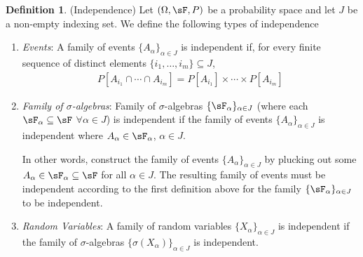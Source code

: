 \documentclass[12pt]{article}
\theoremstyle{plain}
\theoremstyle{definition}
\newtheorem{defn}[thm]{Definition}
\theoremstyle{remark}
\begin{document}
\begin{defn}(Independence)
Let $(\Omega,\sF,P)$ be a probability space and let $J$ be a non-empty
indexing set. We define the following types of independence
\begin{enumerate}
  \item \emph{Events}: A family of events $\{A_\alpha\}_{\alpha\in J}$
    is independent if,
    for every finite sequence of distinct elements
    $\{i_1,\ldots,i_m\}\subseteq J$,
    \begin{align*}
      P[A_{i_1} \cap \cdots \cap A_{i_m}]
      = P[A_{i_1}]\times \cdots \times P[A_{i_m}]
    \end{align*}

  \item \emph{Family of $\sigma$-algebras}: Family of
    $\sigma$-algebras $\{\sF_\alpha\}_{\alpha\in J}$
    (where each $\sF_\alpha\subseteq \sF$ $\forall\alpha\in J$)
    is independent if the family of events
    $\{A_\alpha\}_{\alpha \in J}$ is independent where
    $A_{\alpha}\in \sF_{\alpha}$, $\alpha\in J$.

    In other words, construct the family of events
    $\{A_\alpha\}_{\alpha \in J}$ by plucking out some
    $A_\alpha \in \sF_\alpha\subseteq \sF$ for all $\alpha \in J$. The
    resulting family of events must be independent according to the
    first definition above for the family
    $\{\sF_\alpha\}_{\alpha \in J}$ to be independent.

  \item \emph{Random Variables}: A family of random variables
    $\{X_\alpha\}_{\alpha\in J}$ is independent if
    the family of $\sigma$-algebras
    $\{\sigma(X_\alpha)\}_{\alpha \in J}$ is independent.
\end{enumerate}
\end{defn}
\end{document}
